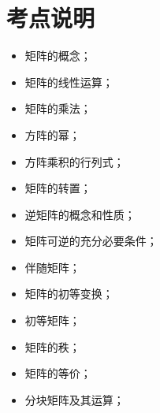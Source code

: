 \section{考点说明}
\begin{itemize}
\item 矩阵的概念；
\item 矩阵的线性运算；
\item 矩阵的乘法；
\item 方阵的幂；
\item 方阵乘积的行列式；
\item 矩阵的转置；
\item 逆矩阵的概念和性质；
\item 矩阵可逆的充分必要条件；
\item 伴随矩阵；
\item 矩阵的初等变换；
\item 初等矩阵；
\item 矩阵的秩；
\item 矩阵的等价；
\item 分块矩阵及其运算；
\end{itemize}


